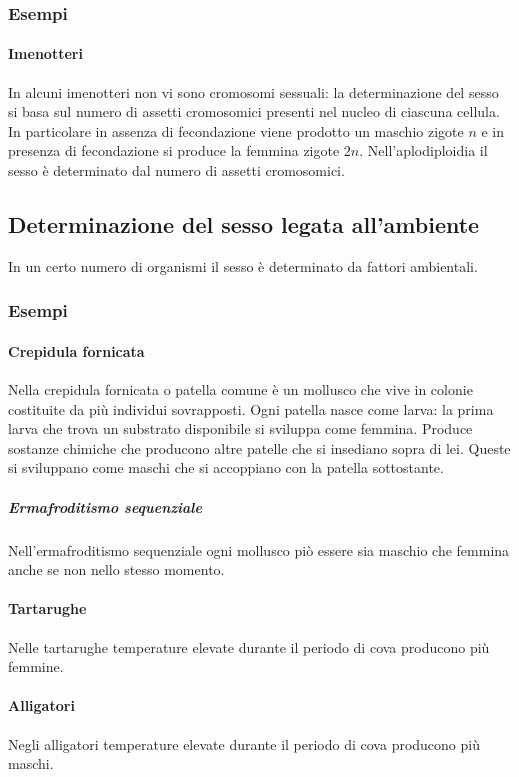 		\subsubsection{Esempi}

			\paragraph{Imenotteri}
			In alcuni imenotteri non vi sono cromosomi sessuali: la determinazione del sesso si basa sul numero di assetti cromosomici presenti nel nucleo di ciascuna cellula.
			In particolare in assenza di fecondazione viene prodotto un maschio zigote $n$ e in presenza di fecondazione si produce la femmina zigote $2n$.
			Nell'aplodiploidia il sesso \`e determinato dal numero di assetti cromosomici.

	\subsection{Determinazione del sesso legata all'ambiente}
	In un certo numero di organismi il sesso \`e determinato da fattori ambientali. 

		\subsubsection{Esempi}

			\paragraph{Crepidula fornicata}
			Nella crepidula fornicata o patella comune \`e un mollusco che vive in colonie costituite da pi\`u individui sovrapposti. 
			Ogni patella nasce come larva: la prima larva che trova un substrato disponibile si sviluppa come femmina.
			Produce sostanze chimiche che producono altre patelle che si insediano sopra di lei.
			Queste si sviluppano come maschi che si accoppiano con la patella sottostante.

				\subparagraph{Ermafroditismo sequenziale}
				Nell'ermafroditismo sequenziale ogni mollusco pi\`o essere sia maschio che femmina anche se non nello stesso momento.

			\paragraph{Tartarughe}
			Nelle tartarughe temperature elevate durante il periodo di cova producono pi\`u femmine.
	
			\paragraph{Alligatori}
			Negli alligatori temperature elevate durante il periodo di cova producono pi\`u maschi.

